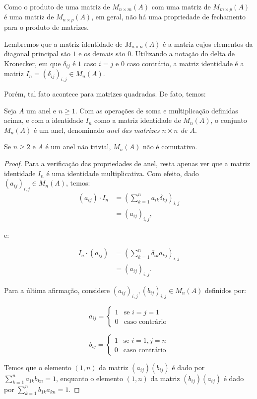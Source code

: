 Como o produto de uma matriz de $M_{n\times m}(A)$ com uma matriz de $M_{m\times p}(A)$ é uma matriz de $M_{n\times p}(A)$, em geral, não há uma propriedade de fechamento para o produto de matrizes.

Lembremos que a matriz identidade de $M_{n\times n}(A)$ é a matriz cujos elementos da diagonal principal são $1$ e os demais são $0$.
Utilizando a notação do delta de Kronecker, em que $\delta_{ij}$ é $1$ caso $i=j$ e $0$ caso contrário, a matriz identidade é a matriz $I_n=(\delta_{ij})_{i,j}\in M_{n}(A)$.

Porém, tal fato acontece para matrizes quadradas. De fato, temos:

\begin{prop}
    Seja $A$ um anel e $n\geq 1$. Com as operações de soma e multiplicação definidas acima, e com a identidade $I_n$ como a matriz identidade de $M_{n}(A)$, o conjunto $M_{n}(A)$ é um anel, denominado \emph{anel das matrizes $n\times n$ de $A$}.

    Se $n\geq 2$ e $A$ é um anel não trivial, $M_n(A)$ não é comutativo.
\end{prop}

\begin{proof}
Para a verificação das propriedades de anel, resta apenas ver que a matriz identidade $I_n$ é uma identidade multiplicativa.
Com efeito, dado $(a_{ij})_{i,j} \in M_n(A)$, temos:
\begin{align*}
    (a_{ij}) \cdot I_n &= \left( \sum_{k=1}^n a_{ik} \delta_{kj} \right)_{i,j} \\
    &= \left( a_{ij} \right)_{i,j},
\end{align*}

e:

\begin{align*}
    I_n \cdot (a_{ij}) &= \left( \sum_{k=1}^n \delta_{ik} a_{kj} \right)_{i,j} \\
    &= \left( a_{ij} \right)_{i,j}.
\end{align*}

Para a última afirmação, considere $(a_{ij})_{i,j}, (b_{ij})_{i,j} \in M_n(A)$ definidos por:
\begin{multicols}{2}
\centering
\[a_{ij}=\begin{cases}
    1 & \text{se } i=j=1\\
    0 & \text{caso contrário}
\end{cases}\]

\[b_{ij}=\begin{cases}
    1 & \text{se } i=1, j=n\\
    0 & \text{caso contrário}
\end{cases}\]
\end{multicols}

Temos que o elemento $(1,n)$ da matriz $(a_{ij})(b_{ij})$ é dado por $\sum_{k=1}^n a_{1k}b_{kn}=1$, enquanto o elemento $(1,n)$ da matriz $(b_{ij})(a_{ij})$ é dado por $\sum_{k=1}^n b_{1k}a_{kn}=1$.
\end{proof}

